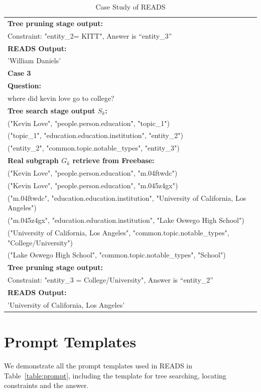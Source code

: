 \documentclass[11pt]{article}
\begin{document}
\begin{table}[]
\begin{tabular}{l}
\textbf{Tree pruning stage output:}\\
Constraint: "entity\_2= KITT", Answer is “entity\_3”\\
\textbf{READS Output:}\\
'William Daniels' \\ \toprule[1pt]                 \textbf{Case 3}                     \\ \toprule[1pt]
\textbf{Question:} \\ where did kevin love go to college?\\
\textbf{Tree search stage output $S_k$:} \\
("Kevin Love", "people.person.education", "topic\_1")\\
("topic\_1", "education.education.institution", "entity\_2")\\
("entity\_2", "common.topic.notable\_types", "entity\_3")\\
\textbf{Real subgraph $G_k$ retrieve from Freebase:}\\
("Kevin Love", "people.person.education", "m.04ftwdc")\\("Kevin Love", "people.person.education", "m.045z4gx")\\ ("m.04ftwdc", "education.education.institution", "University of California, Los Angeles")\\
("m.045z4gx", "education.education.institution", "Lake Oswego High School")\\
("University of California, Los Angeles", "common.topic.notable\_types", "College/University")\\
("Lake Oswego High School", "common.topic.notable\_types", "School")\\
\textbf{Tree pruning stage output:}\\
Constraint: "entity\_3 = College/University", Answer is “entity\_2”\\
\textbf{READS Output:}\\
'University of California, Los Angeles' \\  \bottomrule[1pt]
\end{tabular}
\caption{Case Study of READS}
\label{table:case}
\end{table}

\section{Prompt Templates}
\label{appendix:prompt}

We demonstrate all the prompt templates used in READS in Table~\ref{table:prompt}, including the template for tree searching, locating constraints and the answer.
\end{document}
